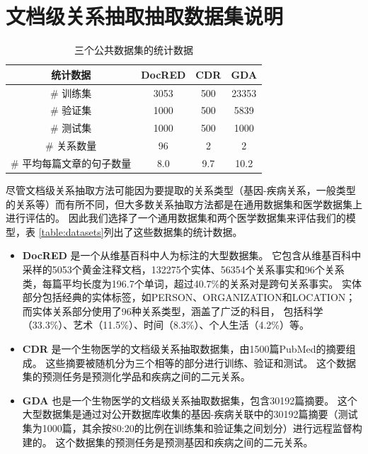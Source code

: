 \documentclass[bachelor]{thesis-uestc}
\begin{document}
\section{文档级关系抽取抽取数据集说明}\label{sec:dataset}

\begin{table}[h]
    \caption{三个公共数据集的统计数据}
    \begin{tabular}{cccc}
    \hline
    统计数据               & DocRED & CDR & GDA   \\ \hline
    \# 训练集                 & 3053   & 500 & 23353 \\
    \# 验证集                   & 1000   & 500 & 5839  \\
    \# 测试集                  & 1000   & 500 & 1000  \\
    \# 关系数量             & 96     & 2   & 2     \\
    \# 平均每篇文章的句子数量 & 8.0    & 9.7 & 10.2  \\ \hline
    \end{tabular}
\end{table} \label{table:datasets}
尽管文档级关系抽取方法可能因为要提取的关系类型（基因-疾病关系，一般类型的关系等）而有所不同，但大多数关系抽取方法都是在通用数据集和医学数据集上进行评估的。
因此我们选择了一个通用数据集和两个医学数据集来评估我们的模型，表 \ref{table:datasets}列出了这些数据集的统计数据。
\begin{itemize}
    \item \textbf{DocRED} \cite{DOCRED} 是一个从维基百科中人为标注的大型数据集。
    它包含从维基百科中采样的5053个黄金注释文档，132275个实体、56354个关系事实和96个关系类，每篇平均长度为196.7个单词，超过40.7\%的关系对是跨句关系事实。
    实体部分包括经典的实体标签，如PERSON、ORGANIZATION和LOCATION；而实体关系部分使用了96种关系类型，涵盖了广泛的科目， 包括科学（33.3\%）、艺术（11.5\%）、时间（8.3\%）、个人生活（4.2\%）等。
    \item \textbf{CDR} \cite{li2016biocreative} 是一个生物医学的文档级关系抽取数据集，由1500篇PubMed的摘要组成。
    这些摘要被随机分为三个相等的部分进行训练、验证和测试。
    这个数据集的预测任务是预测化学品和疾病之间的二元关系。
    \item \textbf{GDA} \cite{GDA} 
    也是一个生物医学的文档级关系抽取数据集，包含30192篇摘要。
    这个大型数据集是通过对公开数据库收集的基因-疾病关联中的30192篇摘要（测试集为1000篇，其余按80:20的比例在训练集和验证集之间划分）进行远程监督构建的。
    这个数据集的预测任务是预测基因和疾病之间的二元关系。
\end{itemize}
\end{document}
